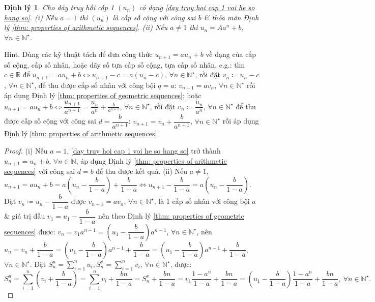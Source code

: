 \documentclass{article}
\newtheorem{dinhly}{Định lý}
\begin{document}
\begin{dinhly}
	Cho dãy truy hồi cấp 1 $(u_n)$ có dạng \eqref{day truy hoi cap 1 voi he so hang so}. (i) Nếu $a = 1$ thì $(u_n)$ là cấp số cộng với công sai $b$ \& thỏa mãn Định lý \ref{thm: properties of arithmetic sequences}. (ii) Nếu $a\ne1$ thì $u_n = Aa^n + b$, $\forall n\in\mathbb{N}^\star$.
\end{dinhly}
{\sf Hint.} Dùng các kỹ thuật tách để đưa công thức $u_{n+1} = au_n + b$ về dạng của cấp số cộng, cấp số nhân, hoặc dãy số tựa cấp số cộng, tựa cấp số nhân, e.g.: tìm $c\in\mathbb{R}$ để $u_{n+1} = au_n + b\Leftrightarrow u_{n+1} - c = a(u_n - c)$, $\forall n\in\mathbb{N}^\star$, rồi đặt $v_n\coloneqq u_n - c$, $\forall n\in\mathbb{N}^\star$, để thu được cấp số nhân với công bội $q = a$: $v_{n+1} = av_n$, $\forall n\in\mathbb{N}^\star$ rồi áp dụng Định lý \ref{thm: properties of geometric sequences}; hoặc $u_{n+1} = au_n + b\Leftrightarrow\dfrac{u_{n+1}}{a^{n+1}} = \dfrac{u_n}{a^n} + \frac{b}{a^{n+1}}$, $\forall n\in\mathbb{N}^\star$, rồi đặt $v_n\coloneqq\dfrac{u_n}{a^n}$, $\forall n\in\mathbb{N}^\star$ để thu được cấp số cộng với công sai $d = \dfrac{b}{a^{n+1}}$: $v_{n+1} = v_n + \dfrac{b}{a^{n+1}}$, $\forall n\in\mathbb{N}^\star$ rồi áp dụng Định lý \ref{thm: properties of arithmetic sequences}.

\begin{proof}
	(i) Nếu $a = 1$, \eqref{day truy hoi cap 1 voi he so hang so} trở thành $u_{n+1} = u_n + b$, $\forall n\in\mathbb{N}$, áp dụng Định lý \ref{thm: properties of arithmetic sequences} với công sai $d = b$ để thu được kết quả. (ii) Nếu $a\ne1$, $u_{n+1} = au_n + b = a\left(u_n - \dfrac{b}{1 - a}\right) + \dfrac{b}{1 - a}\Leftrightarrow u_{n+1} - \dfrac{b}{1 - a} = a\left(u_n - \dfrac{b}{1 - a}\right)$. Đặt $v_n\coloneqq u_n - \dfrac{b}{1 - a}$ được $v_{n+1} = av_n$, $\forall n\in\mathbb{N}^\star$, là 1 cấp số nhân với công bội $a$ \& giá trị đầu $v_1 = u_1 - \dfrac{b}{1 - a}$ nên theo Định lý \ref{thm: properties of geometric sequences} được: $v_n = v_1a^{n-1} = \left(u_1 - \dfrac{b}{1 - a}\right)a^{n-1}$, $\forall n\in\mathbb{N}^\star$, nên $u_n = v_n + \dfrac{b}{1 - a} = \left(u_1 - \dfrac{b}{1 - a}\right)a^{n-1} + \dfrac{b}{1 - a} = \left(u_1 - \dfrac{b}{1 - a}\right)a^{n-1} + \dfrac{b}{1 - a}$, $\forall n\in\mathbb{N}^\star$. Đặt $S_n^u = \sum_{i=1}^n u_i,S_n^v = \sum_{i=1}^n v_i$, $\forall n\in\mathbb{N}^\star$, được:
	\begin{equation*}
		S_n^u = \sum_{i=1}^n \left(v_i + \dfrac{b}{1 - a}\right) = \sum_{i=1}^n v_i + \dfrac{bn}{1 - a} = S_n^v + \dfrac{bn}{1 - a} = v_1\dfrac{1 - a^n}{1 - a} + \dfrac{bn}{1 - a} = \left(u_1 - \dfrac{b}{1 - a}\right)\dfrac{1 - a^n}{1 - a} + \dfrac{bn}{1 - a},\ \forall n\in\mathbb{N}^\star.
	\end{equation*}
\end{proof}
\end{document}
